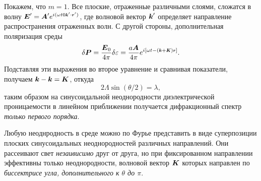 Покажем, что $m=1$. Все плоские, отраженные различными слоями, сложатся в волну $\vc{E}' = \vc{A}' e^{i(\omega t 0 \smallvc{k}' \cdot \smallvc{r}')}$, где волновой вектор $\mbox{\boldmath $k$}'$ определяет направление распространения отраженных волн. С другой стороны, дополнительная поляризация среды
\begin{equation*}
    \delta \vc{P} = \frac{\vc{E}_0}{4 \pi} \delta \varepsilon = \frac{a \vc{A}}{4 \pi} e^{i[\omega t - \left(\smallvc{k}+\smallvc{K}\right)\smallvc{r}]}.
\end{equation*}
Подставляя эти выражения во второе уравнение и сравнивая показатели, получаем $\mbox{\boldmath $k$} - \mbox{\boldmath $k$} = \mbox{\boldmath $K$}$, откуда
\begin{equation*}
    2 \Lambda \sin(\theta/2) = \lambda,
\end{equation*}
таким образом на синусоидальной неоднородности диэлектрической проницаемости в линейном приближении получается дифракционный спектр \textit{только первого порядка}. 

Любую неоднродность в среде можно по Фурье представить в виде суперпозиции плоских синусоидальных неоднородностей различных направлений. Они рассеивают свет \textit{незаивисимо} друг от друга, но при фиксированном направлении эффективны только неоднородности,  волновой вектор $\mbox{\boldmath $K$}$ которых направлен по \textit{биссектрисе угла, дополнительного к $\theta$ до $\pi$}.



